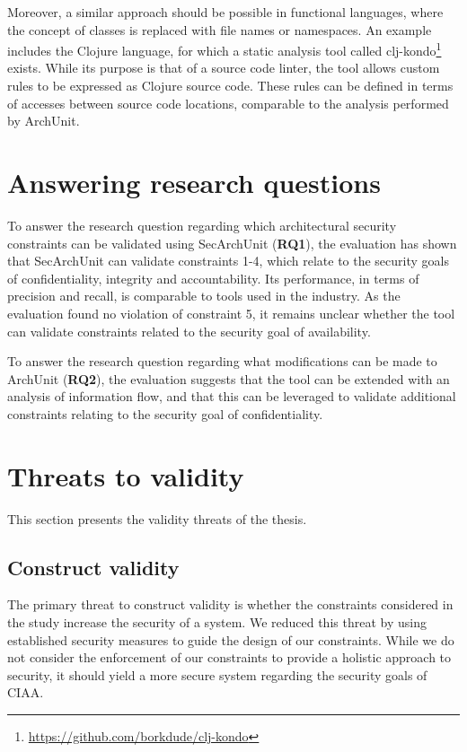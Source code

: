 Moreover, a similar approach should be possible in functional languages, where the concept of classes is replaced with file names or namespaces.
An example includes the Clojure language, for which a static analysis tool called clj-kondo\footnote{\url{https://github.com/borkdude/clj-kondo}} exists. While its purpose is that of a source code linter, the tool allows custom rules to be expressed as Clojure source code. These rules can be defined in terms of accesses between source code locations, comparable to the analysis performed by ArchUnit.



\section{Answering research questions}
To answer the research question regarding which architectural security constraints can be validated using SecArchUnit (\textbf{RQ1}), the evaluation has shown that SecArchUnit can validate constraints 1-4, which relate to the security goals of confidentiality, integrity and accountability. Its performance, in terms of precision and recall, is comparable to tools used in the industry. As the evaluation found no violation of constraint 5, it remains unclear whether the tool can validate constraints related to the security goal of availability.

To answer the research question regarding what modifications can be made to ArchUnit (\textbf{RQ2}), the evaluation suggests that the tool can be extended with an analysis of information flow, and that this can be leveraged to validate additional constraints relating to the security goal of confidentiality.



\section{Threats to validity}
This section presents the validity threats of the thesis. 

\subsection{Construct validity}
The primary threat to construct validity is whether the constraints considered in the study increase the security of a system. We reduced this threat by using established security measures to guide the design of our constraints. While we do not consider the enforcement of our constraints to provide a holistic approach to security, it should yield a more secure system regarding the security goals of CIAA.


